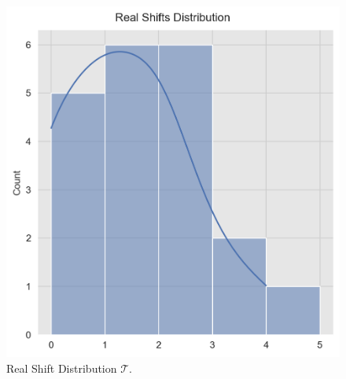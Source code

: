 \documentclass[11pt]{amsart}
\theoremstyle{definition}
\begin{document}
\begin{center}
\begin{figure}
\includegraphics[scale=0.5]{images/real_shifts.png}
\caption{Real Shift Distribution $\mathcal{T}$.}
\label{fig:real_shifts}
\end{figure}
\end{center}
\end{document}
